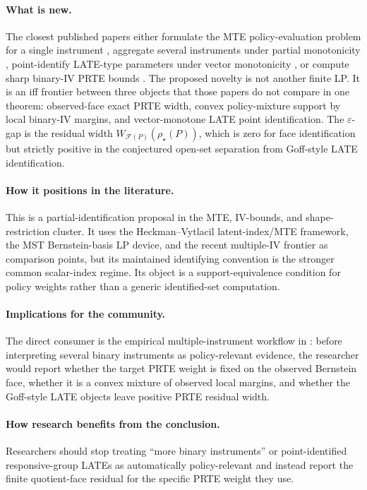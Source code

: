 \documentclass[11pt]{article}
\theoremstyle{definition}
\theoremstyle{plain}
\theoremstyle{remark}
\begin{document}
\paragraph{What is new.}
The closest published papers either formulate the MTE policy-evaluation problem for a single instrument \citep{MogstadSantosTorgovitsky2018}, aggregate several instruments under partial monotonicity \citep{MogstadTorgovitskyWalters2024}, point-identify LATE-type parameters under vector monotonicity \citep{Goff2024}, or compute sharp binary-IV PRTE bounds \citep{HanYang2024}. The proposed novelty is not another finite LP. It is an iff frontier between three objects that those papers do not compare in one theorem: observed-face exact PRTE width, convex policy-mixture support by local binary-IV margins, and vector-monotone LATE point identification. The \(\varepsilon\)-gap is the residual width \(W_{\mathcal F(P)}(\rho_\star(P))\), which is zero for face identification but strictly positive in the conjectured open-set separation from Goff-style LATE identification.

\paragraph{How it positions in the literature.}
This is a partial-identification proposal in the MTE, IV-bounds, and shape-restriction cluster. It uses the Heckman--Vytlacil latent-index/MTE framework, the MST Bernstein-basis LP device, and the recent multiple-IV frontier as comparison points, but its maintained identifying convention is the stronger common scalar-index regime. Its object is a support-equivalence condition for policy weights rather than a generic identified-set computation.

\paragraph{Implications for the community.}
The direct consumer is the empirical multiple-instrument workflow in \citet{MogstadTorgovitskyWalters2024}: before interpreting several binary instruments as policy-relevant evidence, the researcher would report whether the target PRTE weight is fixed on the observed Bernstein face, whether it is a convex mixture of observed local margins, and whether the Goff-style LATE objects leave positive PRTE residual width.

\paragraph{How research benefits from the conclusion.}
Researchers should stop treating ``more binary instruments'' or point-identified responsive-group LATEs as automatically policy-relevant and instead report the finite quotient-face residual for the specific PRTE weight they use.
\end{document}

